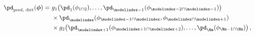 \begin{equation}
  \begin{aligned}
    \pd_{\text{pool, dict}}(\boldsymbol{\phi}) = \,\,
      & g_{1} \! \left(\pd_{1}(\phi_{1 \cap 2}), \ldots, \pd_{\modelindex - 1}(\phi_{\modelindex - 2 \cap \modelindex - 1})\right)  \\
      \,\, & \times \pd_{\modelindex}(\phi_{\modelindex - 1 \cap \modelindex}, \phi_{\modelindex \cap \modelindex + 1}) \\
      \,\, & \times g_{2}\!\left(\pd_{\modelindex + 1}(\phi_{\modelindex + 1 \cap \modelindex + 2}), \ldots, \pd_{\Nm}(\phi_{\Nm - 1 \cap \Nm})\right),
  \end{aligned}
  \label{eqn:dictatorial-one-submodel}
\end{equation}